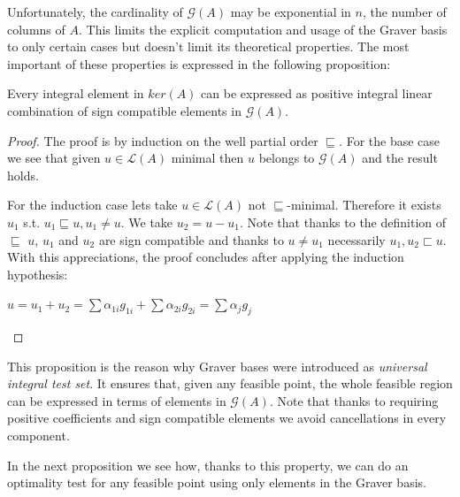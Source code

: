 Unfortunately, the cardinality of $\mathcal{G}(A)$ may be exponential in $n$, the number of columns of $A$. This limits the explicit computation and usage of the Graver basis to only certain cases but doesn't limit its theoretical properties. The most important of these properties is expressed in the following proposition:

\begin{proposition}\label{GB_test_set}
Every integral element in $ker(A)$ can be expressed as positive integral linear combination of sign compatible elements in $\mathcal{G}(A)$.
\end{proposition}
\vspace{-20pt}
\begin{proof}
The proof is by induction on the well partial order $\sqsubseteq$. For the base case we see that given $u \in \mathcal{L}(A)$ minimal then $u$ belongs to $\mathcal{G}(A)$ and the result holds.

For the induction case lets take $u \in \mathcal{L}(A)$ not $\sqsubseteq$-minimal. Therefore it exists $u_1$ s.t. $u_1 \sqsubseteq u, u_1 \neq u$. We take $u_2 = u - u_1$. Note that thanks to the definition of $\sqsubseteq$ $u$, $u_1$ and $u_2$ are sign compatible and thanks to $u \neq u_1$ necessarily  $u_1,u_2 \sqsubset u$. With this appreciations, the proof concludes after applying the induction hypothesis:\\
\vspace{-30pt}
\begin{center}
    $u = u_1 + u_2 = \sum \alpha_{1i}g_{1i} + \sum \alpha_{2i}g_{2i} = \sum \alpha_{j}g_{j}$
\end{center}
\end{proof}

This proposition is the reason why Graver bases were introduced as \textit{universal integral test set}. It ensures that, given any feasible point, the whole feasible region can be expressed in terms of elements in $\mathcal{G}(A)$. Note that thanks to requiring positive coefficients and sign compatible elements we avoid cancellations in every component. 

In the next proposition we see how, thanks to this property, we can do an optimality test for any feasible point using only elements in the Graver basis.

